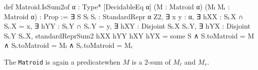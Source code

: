 \begin{leancode}
def Matroid.IsSum2of {α : Type*} [DecidableEq α]
    (M : Matroid α) (Mₗ Mᵣ : Matroid α) :
    Prop :=
  ∃ S Sₗ Sᵣ : StandardRepr α Z2,
  ∃ x y : α,
  ∃ hXX : Sₗ.X ∩ Sᵣ.X = {x},
  ∃ hYY : Sₗ.Y ∩ Sᵣ.Y = {y},
  ∃ hXY : Disjoint Sₗ.X Sᵣ.Y,
  ∃ hYX : Disjoint Sₗ.Y Sᵣ.X,
  standardReprSum2 hXX hYY hXY hYX = some S
  ∧ S.toMatroid = M
  ∧ Sₗ.toMatroid = Mₗ
  ∧ Sᵣ.toMatroid = Mᵣ
\end{leancode}
The \texttt{Matroid} is again a predicate\EmDash when $M$ is a 2-sum of $M_{\ell}$ and $M_{r}$.
